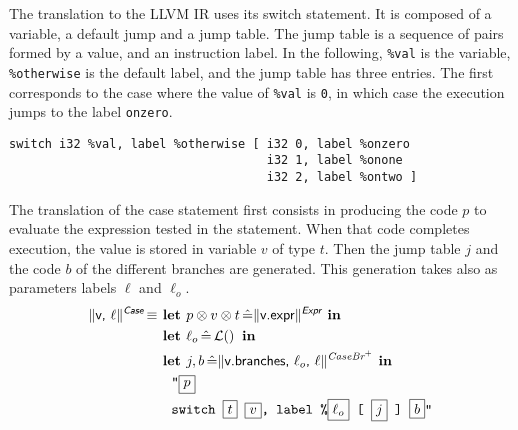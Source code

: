 \documentclass{llncs}
\newcommand{\trad}[2]{\ensuremath{\lVert \textsf{#1} \rVert^{\textit{#2}}}}
\DeclareMathOperator{\isdef}{\equiv}
\DeclareMathOperator{\lbl}{\mathcal{L}()}
\newcommand{\llvm}[1]{\texttt{#1}}
\newcommand{\B}[1]{\textsf{#1}}
\newcommand{\ListOf}[1]{$\mbox{#1}^+$}
\newcommand{\LET}[0]{\textbf{ let }}
\DeclareMathOperator{\BE}{\hat{=}}
\newcommand{\IN}[0]{\textbf{ in }}
\newcommand{\PH}[1]{\framebox{$#1$}}
\newcommand{\sep}[0]{\otimes}
\begin{document}
The translation to the LLVM IR uses its switch statement. It is composed of a
variable, a default jump and a jump table. The jump table is a sequence of pairs
formed by a value, and an instruction label. In the following, \llvm{\%val} is
the variable, \llvm{\%otherwise} is the default label, and the jump table has
three entries. The first corresponds to the case where the value of \llvm{\%val}
is \llvm{0}, in which case the execution jumps to the label \llvm{onzero}.
\begin{verbatim}
switch i32 %val, label %otherwise [ i32 0, label %onzero
                                    i32 1, label %onone
                                    i32 2, label %ontwo ]
\end{verbatim}

The translation of the case statement first consists in producing the code $p$
to evaluate the expression tested in the statement. When that code completes
execution, the value is stored in variable $v$ of type $t$. Then the jump table
$j$ and the code $b$ of the different branches are generated. This generation
takes also as parameters labels $\ell$ and $\ell_o$.
\begin{align*}
  \trad{v, $\ell$}{\B{Case}} \isdef & \LET p \sep v \sep t \BE \trad{v.expr}{\B{Expr}} \IN \\
  & \LET \ell_o \BE \lbl \IN \\
  & \LET j, b \BE \trad{v.branches, $\ell_o$, $\ell$}{\ListOf{CaseBr}} \IN \\
  & \quad \llvm{"\PH{p}} \\
  & \quad \llvm{switch \PH{t} \PH{v}, label \%\PH{\ell_o} [ \PH{j} ] \PH{b}"}
\end{align*}
\end{document}
